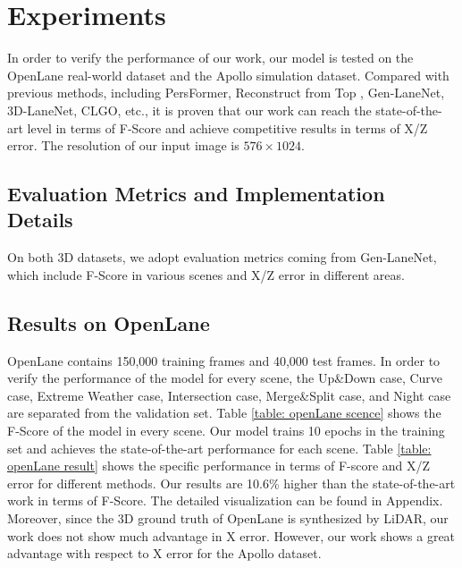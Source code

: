 \documentclass[10pt,twocolumn,letterpaper]{article}
\begin{document}
\section{Experiments}
\label{sec:experiment}
In order to verify the performance of our work, our model is tested on the OpenLane real-world dataset \cite{chen2022persformer} and the Apollo simulation dataset\cite{guo2020gen}. Compared with previous methods, including PersFormer\cite{chen2022persformer}, Reconstruct from Top \cite{li2022reconstruct}, Gen-LaneNet\cite{guo2020gen}, 3D-LaneNet\cite{garnett20193d}, CLGO\cite{liu2022learning}, etc., it is proven that our work can reach the state-of-the-art level in terms of F-Score and achieve competitive results in terms of X/Z error. The resolution of our input image is $576 \times 1024$.

\subsection{Evaluation Metrics and Implementation Details}

On both 3D datasets, we adopt evaluation metrics coming from Gen-LaneNet\cite{guo2020gen}, which include F-Score in various scenes and X/Z error in different areas.
\subsection{Results on OpenLane}
\label{subsec: openlane}
OpenLane contains 150,000 training frames and 40,000 test frames. In order to verify the performance of the model for every scene, the Up\&Down case, Curve case, Extreme Weather case, Intersection case, Merge\&Split case, and Night case are separated from the validation set.  Table \ref{table: openLane scence} shows the F-Score of the model in every scene. Our model trains 10 epochs in the training set and achieves the state-of-the-art performance for each scene. Table \ref{table: openLane result} shows the specific performance in terms of F-score and X/Z error for different methods. Our results are 10.6\% higher than the state-of-the-art work\cite{chen2022persformer} in terms of F-Score. The detailed visualization can be found in Appendix. Moreover, since the 3D ground truth of OpenLane is synthesized by LiDAR, our work does not show much advantage in X error. However, our work shows a great advantage with respect to X error for the Apollo dataset\cite{guo2020gen}.
\end{document}
